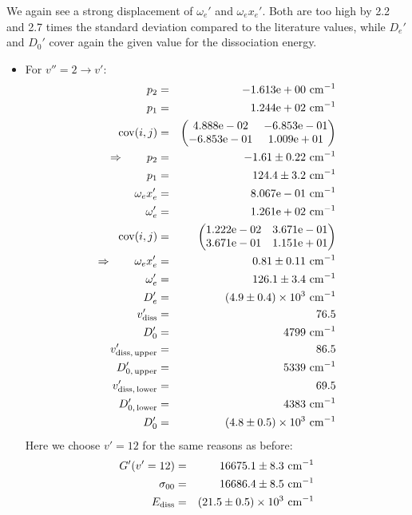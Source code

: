 We again see a strong displacement of $\omega_e'$ and $\omega_e x_e'$. Both are too high 
by 2.2 and 2.7 times the standard deviation compared to the literature values, while 
$D_e'$ and $D_0'$ cover again the given value for the dissociation energy.

\begin{itemize}
    \item For $v'' = 2 \rightarrow v'$:
        \begin{eqnarray}
            p_2 &=& -1.613\mathrm{e}+00 \ \mathrm{cm^{-1}} \nonumber \\
            p_1 &=& 1.244\mathrm{e}+02 \ \mathrm{cm^{-1}} \nonumber \\
            \mathrm{cov}(i, j) &=& 
            \begin{pmatrix}
                4.888\mathrm{e}-02 &-6.853\mathrm{e}-01 \\
                -6.853\mathrm{e}-01 &1.009\mathrm{e}+01 \\
            \end{pmatrix}
            \\ \Rightarrow \qquad
            p_2 &=& -1.61 \pm 0.22 \ \mathrm{cm^{-1}}\\
            p_1 &=& 124.4 \pm 3.2 \ \mathrm{cm^{-1}} \\
            \omega_e x_e' &=& 8.067\mathrm{e}-01 \ \mathrm{cm^{-1}} \nonumber \\
            \omega_e' &=& 1.261\mathrm{e}+02 \ \mathrm{cm^{-1}} \nonumber \\
            \mathrm{cov}(i, j) &=& 
            \begin{pmatrix}
                1.222\mathrm{e}-02 &3.671\mathrm{e}-01 \\
            3.671\mathrm{e}-01 &1.151\mathrm{e}+01 \\
        \end{pmatrix}
        \\ \Rightarrow \qquad
        \omega_e x_e' &=& 0.81 \pm 0.11 \ \mathrm{cm^{-1}}\\
        \omega_e' &=& 126.1 \pm 3.4 \ \mathrm{cm^{-1}} \\
        D_e' &=&\left(4.9 \pm 0.4\right) \times 10^{3} \ \mathrm{cm^{-1}} \\
        v_\mathrm{diss}' &=& 76.5 \\
        D_0' &=& 4799 \ \mathrm{cm^{-1}} \\
        v_\mathrm{diss,\, upper}' &=& 86.5 \\
        D_{0,\, \mathrm{upper}}' &=& 5339 \ \mathrm{cm^{-1}}\\
        v_\mathrm{diss,\, lower}' &=& 69.5 \\
        D_{0,\, \mathrm{lower}}' &=& 4383 \ \mathrm{cm^{-1}} \\
        D_0' &=& \left(4.8 \pm 0.5\right) \times 10^{3} \ \mathrm{cm^{-1}} 
    \end{eqnarray}
    Here we choose $v' = 12$ for the same reasons as before: 
    \begin{eqnarray}
        G'(v' = 12) &=& 16675.1 \pm 8.3 \ \mathrm{cm^{-1}} \\
        \sigma_{00} &=& 16686.4 \pm 8.5 \ \mathrm{cm^{-1}} \\
        E_\mathrm{diss} &=& \left(21.5 \pm 0.5\right) \times 10^{3} \ \mathrm{cm^{-1}}
    \end{eqnarray}
\end{itemize}
